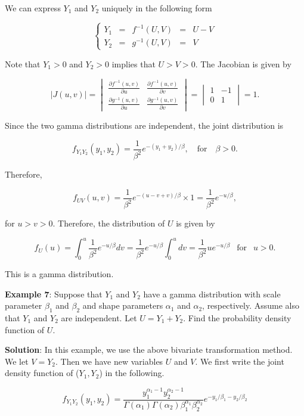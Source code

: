 \documentclass[
]{book}
\begin{document}
We can express \(Y_1\) and \(Y_2\) uniquely in the following form

\[
\left\{
\begin{array}{rrrrr}
   Y_1 & = & f^{-1}(U, V) & = & U - V\\
   Y_2 & = & g^{-1}(U, V) & = & V
\end{array}\right.
\]

Note that \(Y_1 > 0\) and \(Y_2 > 0\) implies that \(U > V > 0\). The Jacobian is given by

\[
\Big| J(u, v) \Big| = \begin{vmatrix}
\frac{\partial f^{-1}(u, v)}{\partial u} & \frac{\partial f^{-1}(u, v)}{\partial v} \\
\frac{\partial g^{-1}(u, v)}{\partial u} & \frac{\partial g^{-1}(u, v)}{\partial v}  
\end{vmatrix}  = \begin{vmatrix}
1  & -1 \\
0 &  1  
\end{vmatrix} = 1.
\]

Since the two gamma distributions are independent, the joint distribution is

\[
f_{Y_1 Y_2}(y_1,y_2) = \frac{1}{\beta^2}e^{-(y_1+y_2)/\beta}, \ \ \ \text{ for } \  \ \ \beta > 0.
\]

Therefore,

\[
f_{UV}(u,v) =  \frac{1}{\beta^2}e^{-(u-v+v)/\beta}
\times 1 =  \frac{1}{\beta^2}e^{-u/\beta},
\]

for \(u > v > 0\). Therefore, the distribution of \(U\) is given by

\[
f_U(u) = \int_0^u  \frac{1}{\beta^2}e^{-u/\beta} dv 
= \frac{1}{\beta^2}e^{-u/\beta} \int_0^u dv = \frac{1}{\beta^2}ue^{-u/\beta} \ \ \text{ for } \ \ u > 0.
\]

This is a gamma distribution.

\textbf{\color{red} Example 7}: Suppose that \(Y_1\) and \(Y_2\) have a gamma distribution with scale parameter \(\beta_1\) and \(\beta_2\) and shape parameters \(\alpha_1\) and \(\alpha_2\), respectively. Assume also that \(Y_1\) and \(Y_2\) are independent. Let \(U = Y_1 + Y_2\). Find the probability density function of \(U\).

\textbf{Solution}: In this example, we use the above bivariate transformation method. We let \(V = Y_2\). Then we have new variables \(U\) and \(V\). We first write the joint density function of (\(Y_1, Y_2\)) in the following.

\[
f_{Y_1Y_2}(y_1, y_2)=\frac{y_1^{\alpha_1-1}y_2^{\alpha_2-1}}{\Gamma(\alpha_1)\Gamma(\alpha_2)\beta_1^{\alpha_1}\beta_2^{\alpha_2}}e^{-y_1/\beta_1 -y_2/\beta_2}
\]
\end{document}
